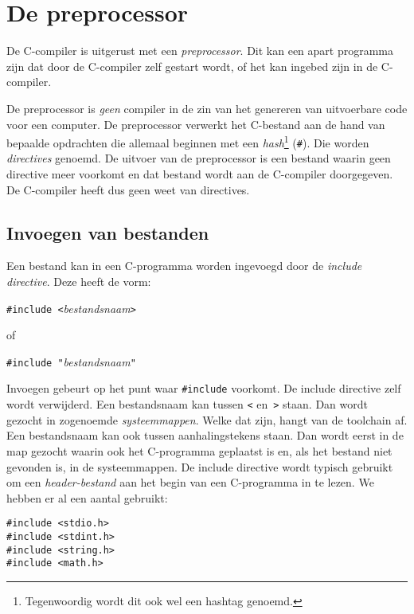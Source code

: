 \chapter{De preprocessor}
\label{cha:preprocessor}
\thispagestyle{empty}

De C-compiler is uitgerust met een \textsl{preprocessor}. Dit kan een apart programma zijn dat door de C-compiler zelf gestart wordt, of het kan ingebed zijn in de C-compiler.

De preprocessor is \textsl{geen} compiler in de zin van het genereren van uitvoerbare code voor een computer. De preprocessor verwerkt het C-bestand aan de hand van bepaalde opdrachten die allemaal beginnen met een \textsl{hash}\footnote{Tegenwoordig wordt dit ook wel een hashtag genoemd.} (\texttt{\#}). Die worden \textsl{directives} genoemd. De uitvoer van de preprocessor is een bestand waarin geen directive meer voorkomt en dat bestand wordt aan de C-compiler doorgegeven. De C-compiler heeft dus geen weet van directives.

\section{Invoegen van bestanden}
Een bestand kan in een C-programma worden ingevoegd door de \textsl{include directive}. Deze heeft de vorm:

\hspace*{1em}\texttt{\#include <}\textsl{bestandsnaam}\texttt{>}

of

\hspace*{1em}\texttt{\#include "{}}\textsl{bestandsnaam}\texttt{"}

Invoegen gebeurt op het punt waar \texttt{\#include} voorkomt. De include directive zelf wordt verwijderd. Een bestandsnaam kan tussen \texttt{<} en~\texttt{>} staan. Dan wordt gezocht in zogenoemde \textsl{systeemmappen}. Welke dat zijn, hangt van de toolchain af. Een bestandsnaam kan ook tussen aanhalingstekens staan. Dan wordt eerst in de map gezocht waarin ook het C-programma geplaatst is en, als het bestand niet gevonden is, in de systeemmappen. De include directive wordt typisch gebruikt om een \textsl{header-bestand} aan het begin van een C-programma in te lezen. We hebben er al een aantal gebruikt:

\hspace*{1em}\texttt{\#include <stdio.h>}\\
\hspace*{1em}\texttt{\#include <stdint.h>}\\
\hspace*{1em}\texttt{\#include <string.h>}\\
\hspace*{1em}\texttt{\#include <math.h>}

